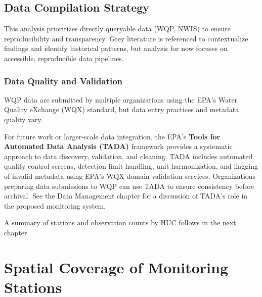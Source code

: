 \documentclass[
  letterpaper,
]{scrbook}
\begin{document}
\section{Data Compilation Strategy}\label{data-compilation-strategy}

This analysis prioritizes directly queryable data (WQP, NWIS) to ensure
reproducibility and transparency. Grey literature is referenced to
contextualize findings and identify historical patterns, but analysis
for now focuses on accessible, reproducible data pipelines.

\subsection{Data Quality and
Validation}\label{data-quality-and-validation}

WQP data are submitted by multiple organizations using the EPA's Water
Quality eXchange (WQX) standard, but data entry practices and metadata
quality vary.

For future work or larger-scale data integration, the EPA's
\textbf{Tools for Automated Data Analysis (TADA)} framework provides a
systematic approach to data discovery, validation, and cleaning. TADA
includes automated quality control screens, detection limit handling,
unit harmonization, and flagging of invalid metadata using EPA's WQX
domain validation services. Organizations preparing data submissions to
WQP can use TADA to ensure consistency before archival. See the Data
Management chapter for a discussion of TADA's role in the proposed
monitoring system.

A summary of stations and observation counts by HUC follows in the next
chapter.

\chapter{Spatial Coverage of Monitoring
Stations}\label{spatial-coverage-of-monitoring-stations}
\end{document}
